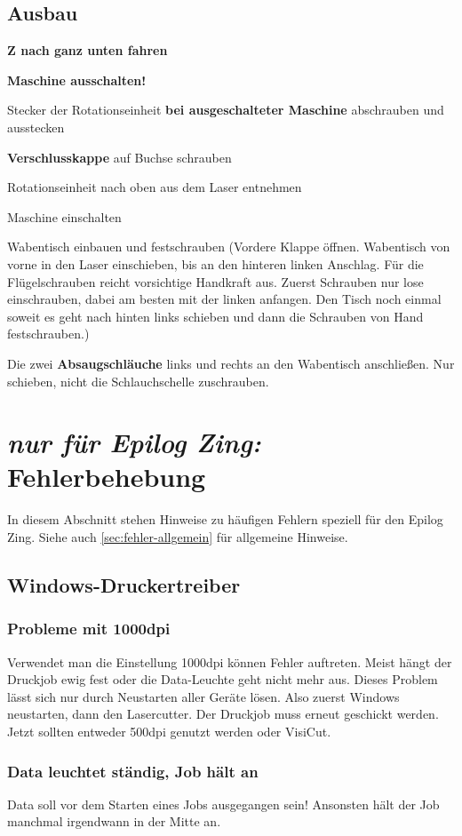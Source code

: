 \documentclass{\basedir/fablab-document}
\newcommand{\nurZing}{\emph{nur für Epilog Zing:} }
\begin{document}
	\subsection{Ausbau}
	\textbf{Z nach ganz unten fahren}

	\textbf{Maschine ausschalten!}

	Stecker der Rotationseinheit \textbf{bei ausgeschalteter Maschine} abschrauben und ausstecken

	\textbf{Verschlusskappe} auf Buchse schrauben

	Rotationseinheit nach oben aus dem Laser entnehmen

	Maschine einschalten

	Wabentisch einbauen und festschrauben (Vordere Klappe öffnen. Wabentisch von vorne in den Laser einschieben, bis an den hinteren linken Anschlag. Für die Flügelschrauben reicht vorsichtige Handkraft aus. Zuerst Schrauben nur lose einschrauben, dabei am besten mit der linken anfangen. Den Tisch noch einmal soweit es geht nach hinten links schieben und dann die Schrauben von Hand festschrauben.)

	 Die zwei \textbf{Absaugschläuche} links und rechts an den Wabentisch anschließen. Nur schieben, nicht die Schlauchschelle zuschrauben.

	\section{\nurZing Fehlerbehebung}
	In diesem Abschnitt stehen Hinweise zu häufigen Fehlern speziell für den Epilog Zing. Siehe auch \cref{sec:fehler-allgemein} für allgemeine Hinweise.

	\subsection{Windows-Druckertreiber}
	\subsubsection{Probleme mit 1000dpi}
	Verwendet man die Einstellung 1000dpi können Fehler auftreten. Meist hängt der Druckjob ewig fest oder die Data-Leuchte geht nicht mehr aus. Dieses Problem lässt sich nur durch Neustarten aller Geräte lösen. Also zuerst Windows neustarten, dann den Lasercutter. Der Druckjob muss erneut geschickt werden. Jetzt sollten entweder 500dpi genutzt werden oder VisiCut.

	\subsubsection{Data leuchtet ständig, Job hält an}
	Data soll vor dem Starten eines Jobs ausgegangen sein! Ansonsten hält der Job manchmal irgendwann in der Mitte an.
\end{document}
